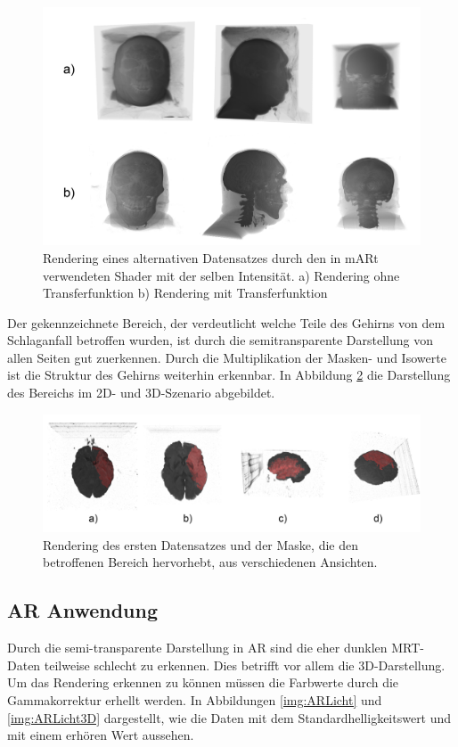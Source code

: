 \begin{figure}[!htb]
	\centering
	\includegraphics[width=0.9\linewidth]{images/visMale_result.png}
	\caption{Rendering eines alternativen Datensatzes durch den in mARt verwendeten Shader mit der selben Intensität. a) Rendering ohne Transferfunktion b) Rendering mit Transferfunktion}
	\label{img:resultsVisMale}
\end{figure}
\FloatBarrier

Der gekennzeichnete Bereich, der verdeutlicht welche Teile des Gehirns von dem Schlaganfall betroffen wurden, ist durch die semitransparente Darstellung von allen Seiten gut zuerkennen. 
Durch die Multiplikation der Masken- und Isowerte ist die Struktur des Gehirns weiterhin erkennbar. In Abbildung \ref{img:resultMask} die Darstellung des Bereichs im 2D- und 3D-Szenario abgebildet.

\begin{figure}[!htb]
	\centering
	\includegraphics[width=0.99\linewidth]{images/mask_results.png}
	\caption{Rendering des ersten Datensatzes und der Maske, die den betroffenen Bereich hervorhebt, aus verschiedenen Ansichten.}
	\label{img:resultMask}
\end{figure}
\FloatBarrier
  
\subsection{AR Anwendung}
Durch die semi-transparente Darstellung in AR sind die eher dunklen MRT-Daten teilweise schlecht zu erkennen. Dies betrifft vor allem die 3D-Darstellung. Um das Rendering erkennen zu können müssen die Farbwerte durch die Gammakorrektur erhellt werden. In Abbildungen \ref{img:ARLicht} und \ref{img:ARLicht3D} dargestellt, wie die Daten mit dem Standardhelligkeitswert und mit einem erhören Wert aussehen.

